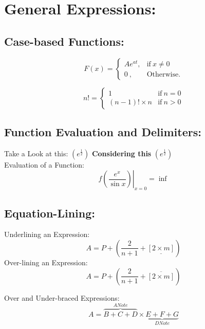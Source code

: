 \documentclass{article}
\begin{document}
  	\section{General Expressions:}
  	\subsection{Case-based Functions:}
  	\begin{equation}
  		F(x) = \begin{cases}
  					A e^{at}, &\text{if} ~ x \neq 0 \\
  					0 ~, & \text{Otherwise.}
  			   \end{cases}
  	\end{equation}
  	
  	\begin{equation}
		n! = \begin{cases}
				1	           & \text{if}~ n = 0 \\
		       (n-1)! \times n & \text{if}~ n > 0
		     \end{cases} 
	\end{equation}
	
	\subsection{Function Evaluation and Delimiters:}
	Take a Look at this: $(e^{\frac{1}{2}})$				\textbf{Considering this} 
	$ \left( e^{\frac{1}{2}} \right) $  \\
	
	Evaluation of a Function:
	\begin{equation}
		\left. f \left(\frac{e^x}{\sin{x}}\right)							\right|_{x=0} = \inf
	\end{equation}
	
	\subsection{Equation-Lining:}
	Underlining an Expression:
	\begin{equation}
		A = P + \left(
		\frac{2}{n+1} + \underline{\left[2\times m			\right]}
			\right)
	\end{equation}
	Over-lining an Expression:
	\begin{equation}
		A = P + \left(
		\frac{2}{n+1} + \overline{\left[2\times m			\right]}
			\right)
	\end{equation}
	
	Over and Under-braced Expressions:
	\begin{equation}
		A = \overbrace{B+C+D}^{ANote} \times
			\underbrace{E+F+G}_{DNote}
	\end{equation}
	
\end{document}
